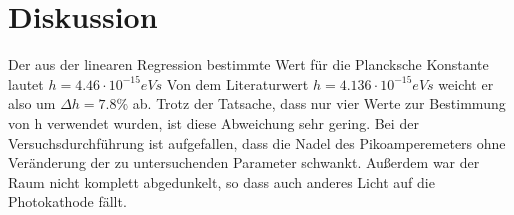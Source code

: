 \section{Diskussion}
\label{sec:Diskussion}

Der aus der linearen Regression bestimmte Wert für die Plancksche Konstante lautet
$h=4.46 \cdot 10^{-15} eVs$
Von dem Literaturwert $h = 4.136 \cdot 10^{-15} eVs$  weicht er also um 
$\Delta h= 7.8\% $ ab. Trotz der Tatsache, dass nur vier Werte zur Bestimmung von 
h verwendet wurden, ist diese Abweichung sehr gering. 
Bei der Versuchsdurchführung ist aufgefallen, dass die Nadel des Pikoamperemeters 
ohne Veränderung der zu untersuchenden Parameter schwankt. Außerdem war der Raum nicht komplett 
abgedunkelt, so dass auch anderes Licht auf die Photokathode fällt.

